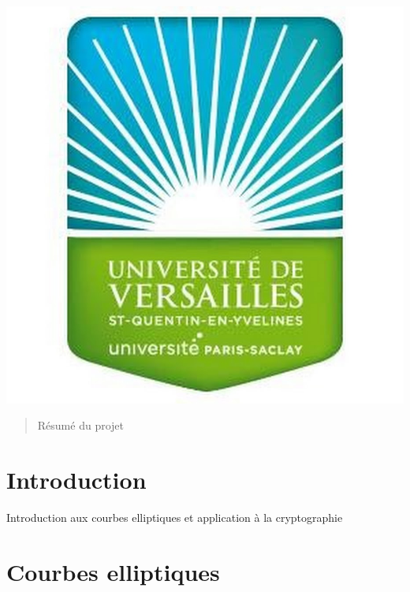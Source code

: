 \documentclass[letterpaper, 12pt]{article}
\begin{document}
\begin{titlepage}
\center {\large \today}\\[2cm]

\includegraphics[scale=0.15]{versailles.jpg} 


\vfill %

\end{titlepage}
\tableofcontents
\newpage

\begin{abstract}
Résumé du projet
\end{abstract}

\section{Introduction}
Introduction aux courbes elliptiques et application à la cryptographie

\section{Courbes elliptiques}
\end{document}

